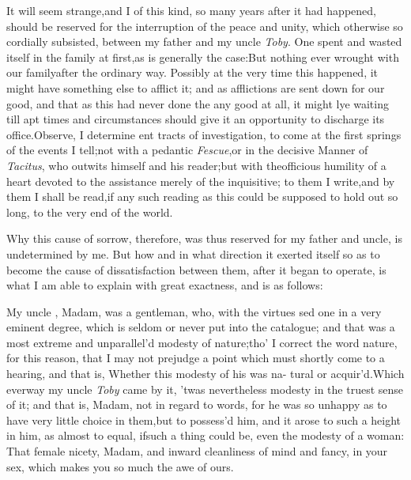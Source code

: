 \documentclass{article}
\begin{document}
It will seem strange,\tsh  and I\break 
{}
of this kind, so many years after it had happened,
should be reserved for the interruption of the peace and unity,
which otherwise so cordially subsisted, between my father and my
uncle \textit{Toby}. One\break
{}
spent and wasted itself in the family at
first,\tsk  as is generally the case:\tsk  But nothing ever
wrought with our family\break after the ordinary way. Possibly at the
very time this happened, it might have something else to afflict
it; and as afflictions are sent down for our good, and that as this
had never done the  any
good at all, it might lye\break
waiting till apt times and circumstances should give it an
opportunity to discharge its office.\tsh  Observe, I
determine\break
{}
ent tracts of investigation, to come at
the first springs of the events I tell;\tsk\break  not with a pedantic
\textit{Fescue},\tsk  or in the decisive Manner of \textit{Tacitus},
who outwits himself and his reader;\tsk  but with the\break officious
humility of a heart devoted to the assistance merely of the
inquisitive;\tsk
to them I write,\tsh  and by them I
shall be read,\tsh  if any such reading as this could be
supposed to hold out so long,\break
to the very end of the
world.\\\eject

Why this cause of sorrow, therefore, was thus reserved for my
father and uncle, is undetermined by me. But how and in what
direction it exerted itself so as to become the cause of
dissatisfaction between them, after it began to operate, is what I
am able to explain with great exactness, and is as follows:

My uncle , Madam, was a
gentleman, who, with the virtues 
sed one in a very eminent degree,
which is seldom or never put into the catalogue; and that was a
most extreme and unparallel’d modesty of
nature;\tsh  tho’ I correct the word nature, for this
reason, that I may not prejudge a point which must shortly come to
a hearing, and that is, Whether this modesty of his was na- tural or
acquir’d.\tsh  Which ever\break way my uncle \textit{Toby}
came by it, ’twas nevertheless modesty in the truest sense of
it; and that is, Madam, not in regard to words, for he was so
unhappy as to have very little choice in them,\tsk  but to
possess’d him, and
it arose to such a height in him, as almost to equal, if\break such a
thing could be, even the modesty of a woman: That female nicety,
Madam, and inward cleanliness of mind and fancy, in your sex, which
makes you so much the awe of ours.
\end{document}

